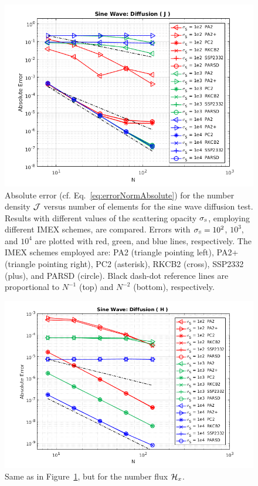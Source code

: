\begin{figure}[h]
  \centering
  \includegraphics[width=1.0\textwidth]{figures/SineWaveDiffusionN}
   \caption{Absolute error (cf. Eq.~\eqref{eq:errorNormAbsolute}) for the number density $\mathcal{J}$ versus number of elements for the sine wave diffusion test.  Results with different values of the scattering opacity $\sigma_{\mbox{\tiny S}}$, employing different IMEX schemes, are compared.  Errors with $\sigma_{\mbox{\tiny S}}=10^{2}$, $10^{3}$, and $10^{4}$ are plotted with red, green, and blue lines, respectively.  The IMEX schemes employed are: PA2 (triangle pointing left), PA2+ (triangle pointing right), PC2 (asterisk), RKCB2 (cross), SSP2332 (plus), and PARSD (circle).  Black dash-dot reference lines are proportional to $N^{-1}$ (top) and $N^{-2}$ (bottom), respectively.}
  \label{fig:SineWaveDiffusionJ}
\end{figure}

\begin{figure}[h]
  \centering
  \includegraphics[width=1.0\textwidth]{figures/SineWaveDiffusionG}
   \caption{Same as in Figure~\ref{fig:SineWaveDiffusionJ}, but for the number flux $\mathcal{H}_{x}$.}
  \label{fig:SineWaveDiffusionH}
\end{figure}

